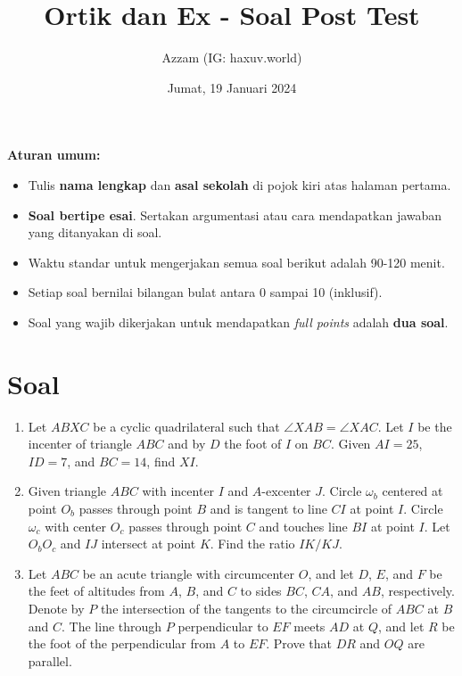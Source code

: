 \documentclass[11pt]{scrartcl}
\title{Ortik dan Ex - Soal Post Test}
\author{Azzam (IG: haxuv.world)}
\date{Jumat, 19 Januari 2024}
\begin{document}
\maketitle
\textbf{Aturan umum:}
\begin{itemize}
    \item Tulis \textbf{nama lengkap} dan \textbf{asal sekolah} di pojok kiri atas halaman pertama.
    \item \textbf{Soal bertipe esai}. Sertakan argumentasi atau cara mendapatkan jawaban yang ditanyakan di soal.
    \item Waktu standar untuk mengerjakan semua soal berikut adalah 90-120 menit.
    \item Setiap soal bernilai bilangan bulat antara 0 sampai 10 (inklusif).
    \item Soal yang wajib dikerjakan untuk mendapatkan \textit{full points} adalah \textbf{dua soal}.
\end{itemize}


\section{Soal}
\begin{enumerate}
\item Let $ABXC$ be a cyclic quadrilateral such that $\angle XAB = \angle XAC$. Let $I$ be the incenter of triangle $ABC$ and by $D$ the foot of $I$ on $BC$. Given $AI = 25$, $ID = 7$, and $BC = 14$, find $XI$.

\item Given triangle $ABC$ with incenter $I$ and $A$-excenter $J$. Circle $\omega_b$ centered at point $O_b$ passes through point $B$ and is tangent to line $CI$ at point $I$. Circle $\omega_c$ with center $O_c$ passes through point $C$ and touches line $BI$ at point $I$. Let $O_bO_c$ and $IJ$ intersect at point $K$. Find the ratio $IK/KJ$.

\item Let $ABC$ be an acute triangle with circumcenter $O$, and let $D$, $E$, and $F$ be the feet of altitudes from $A$, $B$, and $C$ to sides $BC$, $CA$, and $AB$, respectively. Denote by $P$ the intersection of the tangents to the circumcircle of $ABC$ at $B$ and $C$. The line through $P$ perpendicular to $EF$ meets $AD$ at $Q$, and let $R$ be the foot of the perpendicular from $A$ to $EF$. Prove that $DR$ and $OQ$ are parallel.
\end{enumerate}
\end{document}
